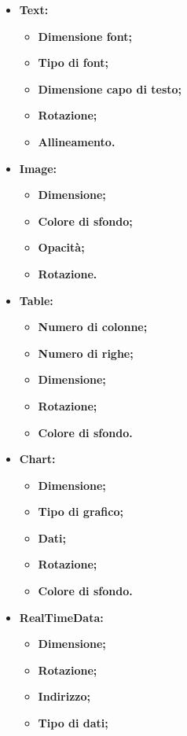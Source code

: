\begin{itemize}

	\item \textbf{Text:}
		\begin{itemize}
			\item \textbf{Dimensione font;}
			\item \textbf{Tipo di font;}
			\item \textbf{Dimensione capo di testo;}
			\item \textbf{Rotazione;}
			\item \textbf{Allineamento.}
		\end{itemize}
	
	\item \textbf{Image:}
		\begin{itemize}
			\item \textbf{Dimensione;}
			\item \textbf{Colore di sfondo;}
			\item \textbf{Opacità;}
			\item \textbf{Rotazione.}
		\end{itemize}

	\item \textbf{Table:}
		\begin{itemize}
			\item \textbf{Numero di colonne;}
			\item \textbf{Numero di righe;}
			\item \textbf{Dimensione;}
			\item \textbf{Rotazione;}
			\item \textbf{Colore di sfondo.}
		\end{itemize}
		
	\item \textbf{Chart:}
		\begin{itemize}
			\item \textbf{Dimensione;}
			\item \textbf{Tipo di grafico;}
			\item \textbf{Dati;}
			\item \textbf{Rotazione;}
			\item \textbf{Colore di sfondo.}
		\end{itemize}
	
	\item \textbf{RealTimeData:}
		\begin{itemize}
			\item \textbf{Dimensione;}
			\item \textbf{Rotazione;}
			\item \textbf{Indirizzo;}
			\item \textbf{Tipo di dati;}
		\end{itemize}
		

\end{itemize}
